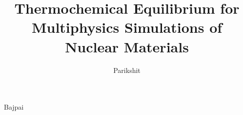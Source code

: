 \documentclass{dissertation}
\theoremstyle{definition}
\theoremstyle{remark}
\begin{document}

\title[Development of the Corrosion Modelling Application Yellowjacket]{Thermochemical Equilibrium for Multiphysics Simulations of Nuclear Materials} 
\author{Parikshit}{Bajpai}

\frontmatter








\tableofcontents

\listoffigures

\listoftables

% 
% 

\mainmatter









% 


\appendix

\thumbfalse

% 


\end{document}
